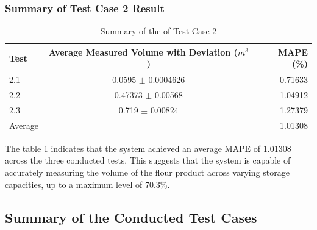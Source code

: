 \subsubsection*{Summary of Test Case 2 Result}
\begin{table}[H]
	\centering
	\caption{Summary of the of Test Case 2}
	\label{ch4:tab:test-2-summary}
	\begin{tabular}{l c r}
		\toprule
		\textbf{Test} & \textbf{Average Measured Volume with Deviation ($m^{3}$)} & \textbf{MAPE (\%)} \\ \midrule

		2.1           & 0.0595 $\pm$ 0.0004626                                    & 0.71633            \\

		2.2           & 0.47373 $\pm$ 0.00568                                     & 1.04912            \\

		2.3           & 0.719 $\pm$ 0.00824                                       & 1.27379            \\ \midrule

		Average       & {}                                                        & 1.01308            \\ \bottomrule
	\end{tabular}
\end{table}

The table \ref{ch4:tab:test-2-summary} indicates that the system achieved an average MAPE of 1.01308 across the three conducted tests. This suggests that the system is capable of accurately measuring the volume of the flour product across varying storage capacities, up to a maximum level of 70.3\%.

\subsection{Summary of the Conducted Test Cases}

